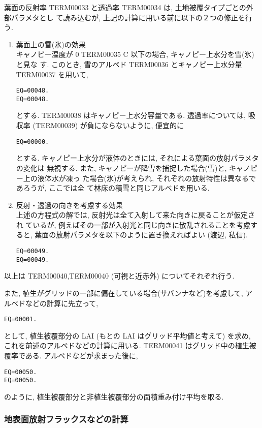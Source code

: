 葉面の反射率 TERM00033 と透過率 TERM00034 は, 土地被覆タイプごとの外部パラメタとし
て読み込むが, 上記の計算に用いる前に以下の２つの修正を行う.
\begin{enumerate}
 \item 葉面上の雪(氷)の効果 \\
 キャノピー温度が 0 TERM00035 C 以下の場合, キャノピー上水分を雪(氷)と見な
 す. このとき, 雪のアルベド TERM00036 とキャノピー上水分量 TERM00037
 を用いて,
\begin{verbatim}
EQ=00048.
EQ=00048.
\end{verbatim}
 とする. TERM00038 はキャノピー上水分容量である.
 透過率については, 吸収率 (TERM00039) が負にならないように, 便宜的に
\begin{verbatim}
EQ=00000.
\end{verbatim}
 とする.
 キャノピー上水分が液体のときには, それによる葉面の放射パラメタの変化は
 無視する.
 また, キャノピーが降雪を捕捉した場合(雪)と, キャノピー上の液体水が凍っ
 た場合(氷)が考えられ, それぞれの放射特性は異なるであろうが, ここでは全
 て林床の積雪と同じアルベドを用いる.
 \item 反射・透過の向きを考慮する効果 \\
 上述の方程式の解では, 反射光は全て入射して来た向きに戻ることが仮定され
 ているが, 例えばその一部が入射光と同じ向きに散乱されることを考慮すると,
 葉面の放射パラメタを以下のように置き換えればよい (渡辺, 私信).
\begin{verbatim}
EQ=00049.
EQ=00049.
\end{verbatim}
\end{enumerate}
以上は TERM00040,TERM00040 (可視と近赤外) についてそれぞれ行う.

また, 植生がグリッドの一部に偏在している場合(サバンナなど)を考慮して, ア
ルベドなどの計算に先立って,
\begin{verbatim}
EQ=00001.
\end{verbatim}
として, 植生被覆部分の LAI (もとの LAI はグリッド平均値と考えて) を求め,
これを前述のアルベドなどの計算に用いる.
TERM00041 はグリッド中の植生被覆率である.
アルベドなどが求まった後に,
\begin{verbatim}
EQ=00050.
EQ=00050.
\end{verbatim}
のように, 植生被覆部分と非植生被覆部分の面積重み付け平均を取る.

\subsubsection{地表面放射フラックスなどの計算}


